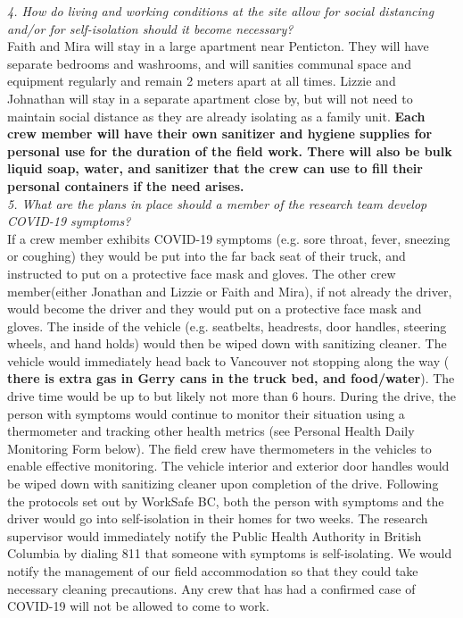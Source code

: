 \documentclass[11pt,letter]{article}
\begin{document}
\emph{4. How do living and working conditions at the site allow for social distancing and/or for self-isolation should it become necessary?}\\
Faith and Mira will stay in a large apartment near Penticton. They will have separate bedrooms and washrooms, and will sanities communal space and equipment regularly and remain 2 meters apart at all times. Lizzie and Johnathan will stay in a separate apartment close by, but will not need to maintain social distance as they are already isolating as a family unit. \textbf{Each crew member will have their own sanitizer and hygiene supplies for personal use for the duration of the field work. There will also be bulk liquid soap, water, and sanitizer that the crew can use to fill their personal containers if the need arises.}\\

\emph{5. What are the plans in place should a member of the research team develop COVID-19 symptoms?}\\
If a crew member exhibits COVID-19 symptoms (e.g. sore throat, fever, sneezing or coughing) they would be put into the far back seat of their truck, and instructed to put on a protective face mask and gloves. The other crew member(either Jonathan and Lizzie or Faith and Mira), if not already the driver, would become the driver and they would put on a protective face mask and gloves. The inside of the vehicle (e.g. seatbelts, headrests, door handles, steering wheels, and hand holds) would then be wiped down with sanitizing cleaner. The vehicle would immediately head back to Vancouver not stopping along the way ( \textbf{there is extra gas in Gerry cans in the truck bed, and food/water}). The drive time would be up to but likely not more than 6 hours. During the drive, the person with symptoms would continue to monitor their situation using a thermometer and tracking other health metrics (see Personal Health Daily Monitoring Form below). The field crew have thermometers in the vehicles to enable effective monitoring. The vehicle interior and exterior door handles would be wiped down with sanitizing cleaner upon completion of the drive. Following the protocols set out by WorkSafe BC, both the person with symptoms and the driver would go into self-isolation in their homes for two weeks. The research supervisor would immediately notify the Public Health Authority in British Columbia by dialing 811 that someone with symptoms is self-isolating. We would notify the management of our field accommodation so that they could take necessary cleaning precautions. Any crew that has had a confirmed case of COVID-19 will not be allowed to come to work.\\
\end{document}
